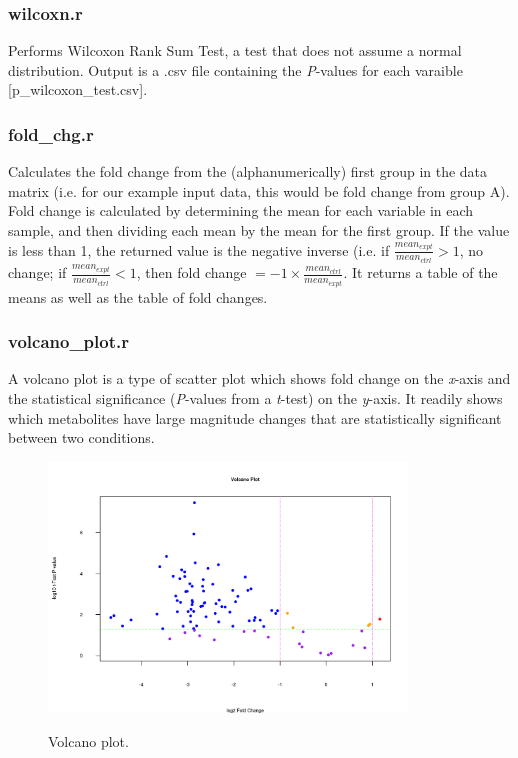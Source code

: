 \documentclass[english,a4paper,12pt]{article}
\begin{document}
\subsubsection*{wilcoxn.r}
Performs Wilcoxon Rank Sum Test, a test that does not assume a normal distribution. Output is a .csv file containing the \emph{P}-values for each varaible [\textsf{p\_wilcoxon\_test.csv}].

\subsubsection*{fold\_chg.r}
Calculates the fold change from the (alphanumerically) first group in the data matrix (i.e. for our example input data, this would be fold change from group A). Fold change is calculated by determining the mean for each variable in each sample, and then dividing each mean by the mean for the first group. If the value is less than 1, the returned value is the negative inverse (i.e. if
$\frac{mean_{expt}}{mean_{ctrl}} > 1$, no change; if $\frac{mean_{expt}}{mean_{ctrl}} < 1 $, then fold change $= -1\times\frac{mean_{ctrl}}{mean_{expt}}$. It returns a table of the means as well as the table of fold changes.

\subsubsection*{volcano\_plot.r}
A volcano plot is a type of scatter plot which shows fold change on the \emph{x}-axis and the statistical significance (\emph{P}-values from a \emph{t}-test) on the \emph{y}-axis. It readily shows which metabolites have large magnitude changes that are statistically significant between two conditions.

\begin{figure}[h!tb]
\centering
\includegraphics[width=0.85\textwidth]{images/volcano_plot.png} \\
\caption[Volcano plot]{Volcano plot.}
\label{fig:volcano_plot}
\end{figure}
\end{document}
